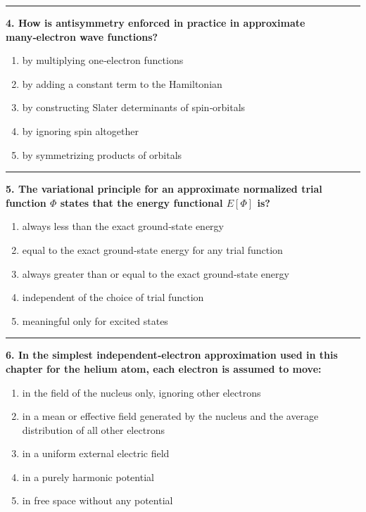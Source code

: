 \documentclass[
  english,
  9pt,
]{extbook}
\providecommand{\tightlist}{%
  \setlength{\itemsep}{0pt}\setlength{\parskip}{0pt}}
\theoremstyle{definition}
\theoremstyle{definition}
\theoremstyle{definition}
\theoremstyle{definition}
\theoremstyle{remark}
\begin{document}
\begin{center}\rule{0.5\linewidth}{0.5pt}\end{center}

\textbf{4. How is antisymmetry enforced in practice in approximate many‑electron wave functions?}

\begin{enumerate}
\def\labelenumi{\alph{enumi}.}
\tightlist
\item
  by multiplying one‑electron functions
\item
  by adding a constant term to the Hamiltonian
\item
  by constructing Slater determinants of spin‑orbitals
\item
  by ignoring spin altogether
\item
  by symmetrizing products of orbitals
\end{enumerate}

\begin{center}\rule{0.5\linewidth}{0.5pt}\end{center}

\textbf{5. The variational principle for an approximate normalized trial function \(\Phi\) states that the energy functional \(E[\Phi]\) is?}

\begin{enumerate}
\def\labelenumi{\alph{enumi}.}
\tightlist
\item
  always less than the exact ground‑state energy
\item
  equal to the exact ground‑state energy for any trial function
\item
  always greater than or equal to the exact ground‑state energy
\item
  independent of the choice of trial function
\item
  meaningful only for excited states
\end{enumerate}

\begin{center}\rule{0.5\linewidth}{0.5pt}\end{center}

\textbf{6. In the simplest independent‑electron approximation used in this chapter for the helium atom, each electron is assumed to move:}

\begin{enumerate}
\def\labelenumi{\alph{enumi}.}
\tightlist
\item
  in the field of the nucleus only, ignoring other electrons
\item
  in a mean or effective field generated by the nucleus and the average distribution of all other electrons
\item
  in a uniform external electric field
\item
  in a purely harmonic potential
\item
  in free space without any potential
\end{enumerate}
\end{document}
